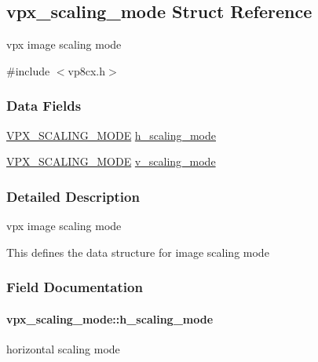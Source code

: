 \hypertarget{structvpx__scaling__mode}{}\subsection{vpx\+\_\+scaling\+\_\+mode Struct Reference}
\label{structvpx__scaling__mode}


vpx image scaling mode  




{\ttfamily \#include $<$vp8cx.\+h$>$}

\subsubsection*{Data Fields}
\begin{DoxyCompactItemize}
\item 
\hyperlink{group__vp8__encoder_ga100ca891ad96995e61780ae777bf8663}{V\+P\+X\+\_\+\+S\+C\+A\+L\+I\+N\+G\+\_\+\+M\+O\+DE} \hyperlink{structvpx__scaling__mode_a7b060a85f010b221a40fbca4c3857c27}{h\+\_\+scaling\+\_\+mode}
\item 
\hyperlink{group__vp8__encoder_ga100ca891ad96995e61780ae777bf8663}{V\+P\+X\+\_\+\+S\+C\+A\+L\+I\+N\+G\+\_\+\+M\+O\+DE} \hyperlink{structvpx__scaling__mode_a3a44f5213ead89e6e488d99bb5a81563}{v\+\_\+scaling\+\_\+mode}
\end{DoxyCompactItemize}


\subsubsection{Detailed Description}
vpx image scaling mode 

This defines the data structure for image scaling mode 

\subsubsection{Field Documentation}
\paragraph[{\texorpdfstring{h\+\_\+scaling\+\_\+mode}{h_scaling_mode}}]{ vpx\+\_\+scaling\+\_\+mode\+::h\+\_\+scaling\+\_\+mode}\hypertarget{structvpx__scaling__mode_a7b060a85f010b221a40fbca4c3857c27}{}\label{structvpx__scaling__mode_a7b060a85f010b221a40fbca4c3857c27}
horizontal scaling mode 
